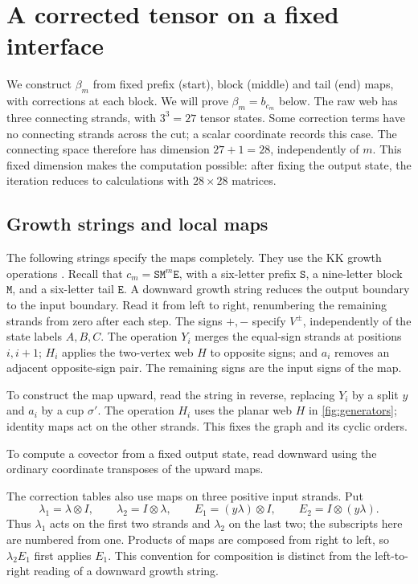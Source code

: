 \documentclass[a4paper,11pt]{amsart}
\newcommand{\wordstart}{\mathtt{S}}
\newcommand{\wordmiddle}{\mathtt{M}}
\newcommand{\wordend}{\mathtt{E}}
\numberwithin{equation}{subsection}
\theoremstyle{plain}
\theoremstyle{definition}
\theoremstyle{remark}
\begin{document}
\section{A corrected tensor on a fixed interface}\label{sec:construction}

We construct $\beta_m$ from fixed prefix (start), block (middle) and tail (end) maps, with corrections at each block. We will prove $\beta_m=b_{c_m}$ below.
The raw web has three connecting strands, with $3^3=27$
tensor states. Some correction terms have no connecting strands across
the cut; a scalar coordinate records this case. The connecting space
therefore has dimension
$27+1=28$, independently of $m$. This fixed dimension makes the computation possible: after
fixing the output state, the iteration reduces to calculations with
$28\times28$ matrices.

\subsection{Growth strings and local maps}\label{sec:localmaps}

The following strings specify the maps completely. They use the
KK growth operations \cite[Section 5]{KK}.
Recall that $c_m=\wordstart\wordmiddle^m\wordend$, with a six-letter prefix $\wordstart$, a nine-letter
block $\wordmiddle$, and a six-letter tail $\wordend$.
A downward growth string reduces the output boundary to the input
boundary. Read it from left to right, renumbering the remaining
strands from zero after each step. The signs $+,-$ specify
$V^\pm$, independently of the state labels $A,B,C$. The operation $Y_i$ merges the equal-sign
strands at positions $i,i+1$; $H_i$ applies the two-vertex web $H$ to
opposite signs; and $a_i$ removes an adjacent opposite-sign pair.
The remaining signs are the input signs of the map.

To construct the map upward, read the string in reverse, replacing
$Y_i$ by a split $y$ and $a_i$ by a cup $\sigma'$.
The operation $H_i$ uses the planar web $H$ in
\autoref{fig:generators}; identity maps act on the other strands.
This fixes the graph and its cyclic orders.

To compute a covector from a fixed output state, read downward
using the ordinary coordinate transposes of the upward maps.

The correction tables also use maps on three positive input strands.
Put
\[
\lambda_1=\lambda\otimes I,
\qquad \lambda_2=I\otimes\lambda,
\qquad E_1=(y\lambda)\otimes I,
\qquad E_2=I\otimes(y\lambda).
\]
Thus $\lambda_1$ acts on the first two strands and $\lambda_2$ on the
last two; the subscripts here are numbered from one. Products of maps
are composed from right to left, so $\lambda_2E_1$ first applies $E_1$.
This convention for composition is distinct from the left-to-right
reading of a downward growth string.
\end{document}
